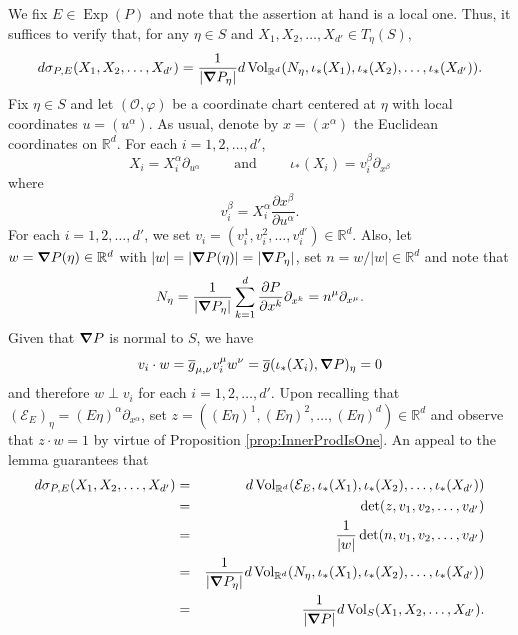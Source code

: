 \documentclass[smallextended]{svjour3}
\theoremstyle{remark}
\renewenvironment{proof}[1][\proofname]{\renewcommand\xproofname{#1}\xproof}{\endxproof}
\newcommand\Exp{\operatorname{Exp}}
\renewcommand\det{\operatorname{det}}
\newcommand{\Vol}{\operatorname{Vol}}
\begin{document}
\begin{proof}[Proof of Proposition \ref{prop:FormRiemannRelation}]
We fix $E\in\Exp(P)$ and note that the assertion at hand is a local one. Thus, it suffices to verify that, for any $\eta\in S$ and $X_1,X_2,\dots,X_{d'}\in T_\eta(S)$, 
\begin{equation*}
    d\sigma_{P,E}(X_1,X_2,\dots,X_{d'})=\frac{1}{|\grad P_{\eta}|}d\Vol_{\mathbb{R}^d}(N_\eta,\iota_*(X_1),\iota_*(X_2),\dots,\iota_*(X_{d'})).
\end{equation*}
Fix $\eta\in S$ and let $(\mathcal{O},\varphi)$ be a coordinate chart centered at $\eta$ with local coordinates $u=(u^{\alpha})$. As usual, denote by $x=(x^{\alpha})$ the Euclidean coordinates on $\mathbb{R}^d$.  For each $i=1,2,\dots,{d'}$, \begin{equation*}
X_i=X_i^\alpha \partial_{u^{\alpha}}\hspace{1cm}\mbox{and}\hspace{1cm}\iota_*(X_i)=v_i^\beta\partial_{x^{\beta}}
\end{equation*}
where
\begin{equation*}
v_i^\beta =X_i^\alpha\frac{\partial x^\beta}{\partial u^\alpha}.
\end{equation*}
For each $i=1,2,\dots,d'$, we set $v_i=(v_i^1,v_i^2,\dots,v_i^{d'})\in\mathbb{R}^d$. Also, let $w=\grad P(\eta)\in\mathbb{R}^d$ with $|w|=|\grad P(\eta)|=|\grad P_\eta|$, set $n=w/|w|\in\mathbb{R}^d$ and note that
\begin{equation*}
    N_\eta=\frac{1}{|\grad P_\eta|}\sum_{k=1}^d\frac{\partial P}{\partial x^{k}}\partial_{x^k}=n^{\mu}\partial_{x^\mu}.
\end{equation*}Given that $\grad P$ is normal to $S$, we have
\begin{equation*}
    v_i\cdot w=\overline{g}_{\mu,\nu}v_i^\mu w^\nu= \overline{g}(\iota_*(X_i),\grad P)_\eta=0
\end{equation*}
and therefore $w\perp v_i$ for each $i=1,2,\dots,{d'}$. Upon recalling that $(\mathcal{E}_E)_\eta=(E\eta)^\alpha\partial_{x^{\alpha}}$, set $z=((E\eta)^1,(E\eta)^2,\dots,(E\eta)^d)\in\mathbb{R}^d$ and observe that $z\cdot w=1$ by virtue of Proposition \ref{prop:InnerProdIsOne}. An appeal to the lemma guarantees that
\begin{eqnarray*}
d\sigma_{P,E}(X_1,X_2,\dots,X_{d'})&=&d\Vol_{\mathbb{R}^d}(\mathcal{E}_E,\iota_*(X_1),\iota_*(X_2),\dots,\iota_*(X_{d'}))\\
&=&\det(z,v_1,v_2,\dots,v_{d'})\\
&=&\frac{1}{|w|}\det(n,v_1,v_2,\dots,v_{d'})\\
&=&\frac{1}{|\grad P_\eta|}d\Vol_{\mathbb{R}^d}(N_\eta,\iota_*(X_1),\iota_*(X_2),\dots,\iota_*(X_{d'}))\\
&=&\frac{1}{|\grad P|}d\Vol_S(X_1,X_2,\dots,X_{d'}).
\end{eqnarray*}
\end{proof}
\end{document}
